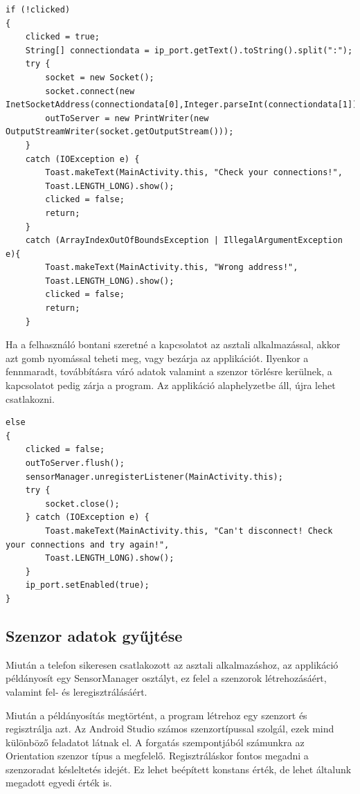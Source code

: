 \documentclass[
]{thesis-ekf}
\theoremstyle{definition}
\theoremstyle{remark}
\begin{document}
\begin{lstlisting}[caption={Csatlakozás az asztali alkalmazáshoz}]
if (!clicked)
{
	clicked = true;
	String[] connectiondata = ip_port.getText().toString().split(":");
	try {
		socket = new Socket();
		socket.connect(new InetSocketAddress(connectiondata[0],Integer.parseInt(connectiondata[1])),100);
		outToServer = new PrintWriter(new OutputStreamWriter(socket.getOutputStream()));
	}
	catch (IOException e) {
		Toast.makeText(MainActivity.this, "Check your connections!",
		Toast.LENGTH_LONG).show();
		clicked = false;
		return;
	}
	catch (ArrayIndexOutOfBoundsException | IllegalArgumentException e){
		Toast.makeText(MainActivity.this, "Wrong address!",
		Toast.LENGTH_LONG).show();
		clicked = false;
		return;
	}
\end{lstlisting}

Ha a felhasználó bontani szeretné a kapcsolatot az asztali alkalmazással, akkor azt gomb nyomással teheti meg, vagy bezárja az applikációt. Ilyenkor a fennmaradt, továbbításra váró adatok valamint a szenzor törlésre kerülnek, a kapcsolatot pedig zárja a program. Az applikáció alaphelyzetbe áll, újra lehet csatlakozni. 

\begin{lstlisting}[caption={Kapcsolat bontása az asztali alkalmazással}]
else
{
	clicked = false;
	outToServer.flush();
	sensorManager.unregisterListener(MainActivity.this);
	try {
		socket.close();
	} catch (IOException e) {
		Toast.makeText(MainActivity.this, "Can't disconnect! Check your connections and try again!",
		Toast.LENGTH_LONG).show();
	}
	ip_port.setEnabled(true);
}
\end{lstlisting}

\subsection{Szenzor adatok gyűjtése}
Miután a telefon sikeresen csatlakozott az asztali alkalmazáshoz, az applikáció példányosít egy SensorManager osztályt, ez felel a szenzorok létrehozásáért, valamint fel- és leregisztrálásáért.\cite{Android Studio}

Miután a példányosítás megtörtént, a program létrehoz egy szenzort és regisztrálja azt. Az Android Studio számos szenzortípussal szolgál, ezek mind különböző feladatot látnak el. A forgatás szempontjából számunkra az Orientation szenzor típus a megfelelő. Regisztráláskor fontos megadni a szenzoradat késleltetés idejét. Ez lehet beépített konstans érték, de lehet általunk megadott egyedi érték is. 
\end{document}
